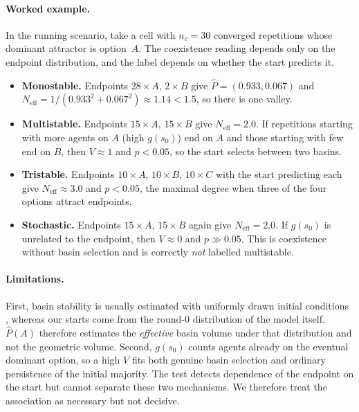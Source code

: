 \paragraph{Worked example.}
In the running scenario, take a cell with $n_c = 30$ converged repetitions whose
dominant attractor is option~$A$. The coexistence reading depends only on the
endpoint distribution, and the label depends on whether the start predicts it.
\begin{itemize}
  \item \textbf{Monostable.} Endpoints $28 \times A$, $2 \times B$ give
        $\hat{P} = (0.933, 0.067)$ and
        $N_{\mathrm{eff}} = 1/(0.933^2 + 0.067^2) \approx 1.14 < 1.5$, so there is
        one valley.
  \item \textbf{Multistable.} Endpoints $15 \times A$, $15 \times B$ give
        $N_{\mathrm{eff}} = 2.0$. If repetitions starting with more agents on $A$
        (high $g(s_0)$) end on $A$ and those starting with few end on $B$, then
        $V \approx 1$ and $p < 0.05$, so the start selects between two basins.
  \item \textbf{Tristable.} Endpoints $10 \times A$, $10 \times B$, $10 \times C$
        with the start predicting each give $N_{\mathrm{eff}} \approx 3.0$ and
        $p < 0.05$, the maximal degree when three of the four options attract endpoints.
  \item \textbf{Stochastic.} Endpoints $15 \times A$, $15 \times B$ again give
        $N_{\mathrm{eff}} = 2.0$. If $g(s_0)$ is unrelated to the endpoint, then
        $V \approx 0$ and $p \gg 0.05$. This is coexistence without basin
        selection and is correctly \emph{not} labelled multistable.
\end{itemize}

\paragraph{Limitations.}
First, basin stability is usually estimated with uniformly drawn initial
conditions \citep{menck2013basin}, whereas our starts come from the round-$0$
distribution of the model itself. $\hat{P}(A)$ therefore estimates the \emph{effective} basin volume
under that distribution and not the geometric volume. Second, $g(s_0)$ counts
agents already on the eventual dominant option, so a high $V$ fits both genuine
basin selection and ordinary persistence of the initial majority. The test detects
dependence of the endpoint on the start but cannot separate these two mechanisms.
We therefore treat the association as necessary but not decisive.

